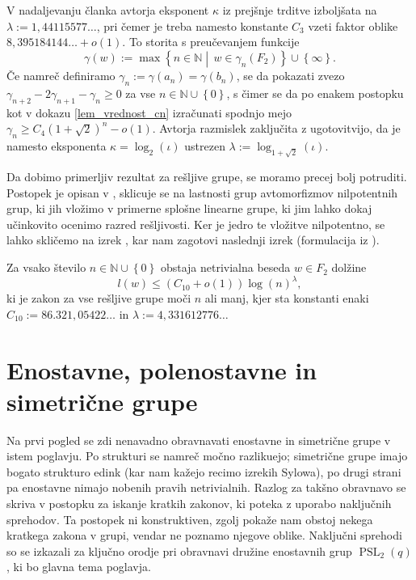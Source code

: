 \documentclass[mat1, tisk]{fmfdelo}
\numberwithin{equation}{section}  %
\begin{document}
V nadaljevanju članka \cite{Elkasapy_Thom_2013} avtorja eksponent $\kappa$ iz prejšnje trditve izboljšata na $\lambda := 1{,}44115577 \ldots$, pri čemer je treba namesto konstante $C_3$ vzeti faktor oblike $8{,}395184144 \ldots + o(1)$. To storita s preučevanjem funkcije \begin{equation*}
\gamma(w) := \max \left\{ n \in  \mathbb{N}  \middle|\, w \in \gamma_{n}(F_2) \right\} \cup \left\{ \infty\right\}. 
\end{equation*}  
Če namreč definiramo $\gamma_n := \gamma(a_{n}) = \gamma(b_{n})$, se da pokazati zvezo $\gamma_{n + 2} - 2 \gamma_{n+1}  - \gamma_{n} \ge  0$ za vse $n \in  \mathbb{N} \cup \left\{ 0\right\}$, s čimer se da po enakem postopku kot v dokazu \ref*{lem_vrednost_cn} izračunati spodnjo mejo $\gamma_n \ge C_4 (1 + \sqrt{2})^{n} - o(1)$.
Avtorja razmislek zaključita z ugotovitvijo, da je namesto eksponenta $\kappa = \log_2( \iota)$ ustrezen $\lambda := \log_{1 + \sqrt{2}}(\iota)$.

Da dobimo primerljiv rezultat za rešljive grupe, se moramo precej bolj potruditi. Postopek je opisan v \cite[str.~3--4]{Thom_2015}, sklicuje se na lastnosti grup avtomorfizmov nilpotentnih grup, ki jih vložimo
v primerne splošne linearne grupe, ki jim lahko dokaj učinkovito ocenimo razred rešljivosti. Ker je jedro te vložitve nilpotentno, se lahko skličemo na izrek \cite{trd_koncna_ugotovitev_nilpotentne_v_nalogi}, kar nam zagotovi naslednji izrek (formulacija iz \cite[str.~25]{Schneider_2016}).  

\begin{izrek}
\label{izr_glavni_izrek_resljive}
 Za vsako število $n \in  \mathbb{N} \cup  \left\{ 0\right\}$ obstaja netrivialna beseda $w \in F_2$ dolžine \begin{equation*}
 l(w) \le (C_{10} + o(1)) \log(n)^{\lambda},
 \end{equation*}  
   ki je zakon za vse rešljive grupe moči $n$ ali manj, kjer sta konstanti enaki $C_{10} := 86.321{,}05422 \ldots$ in $\lambda := 4{,}331612776 \ldots$ 
\end{izrek}


\section{Enostavne, polenostavne in simetrične grupe}

Na prvi pogled se zdi nenavadno obravnavati enostavne in simetrične grupe v istem poglavju. Po strukturi se namreč močno razlikuejo; simetrične grupe imajo bogato strukturo edink (kar nam kažejo recimo izrekih Sylowa), po drugi strani pa enostavne
nimajo nobenih pravih netrivialnih. Razlog za takšno obravnavo se skriva v postopku za iskanje kratkih zakonov, ki poteka z uporabo naključnih sprehodov. Ta postopek ni konstruktiven, zgolj pokaže nam obstoj nekega kratkega zakona v grupi, vendar ne poznamo njegove oblike.
Naključni sprehodi so se izkazali za ključno orodje pri obravnavi družine enostavnih grup $\operatorname{PSL}_2(q)$, ki bo glavna tema poglavja.
\end{document}
